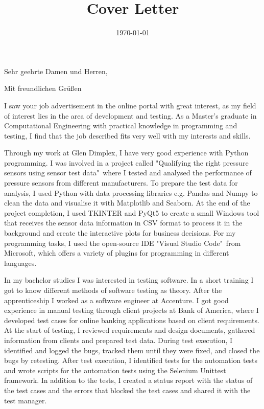 \documentclass[11.5pt,a4paper,sans]{moderncv}        %
\title{Cover Letter}                               %
\begin{document}
\subject{\small Bewerbung als Softwareingenieur Testautomatisierung}
\date{\small \today}

\opening{\vspace{-1mm} \small Sehr geehrte Damen und Herren,} %
\closing{\vspace{1mm} \small Mit freundlichen Grüßen \\ %
\vspace{-14mm}}
\makelettertitle
\vspace*{-8mm}
\justify
I saw your job advertisement in the online portal with great interest, as my field of interest lies in the area of development and testing. As a Master's graduate in Computational Engineering with practical knowledge in programming and testing, I find that the job described fits very well with my interests and skills.
        
Through my work at Glen Dimplex, I have very good experience with Python programming. I was involved in a project called "Qualifying the right pressure sensors using sensor test data"\, where I tested and analysed the performance of pressure sensors from different manufacturers. To prepare the test data for analysis, I used Python with data processing libraries e.g. Pandas and Numpy to clean the data and visualise it with Matplotlib and Seaborn. At the end of the project completion, I used TKINTER and PyQt5 to create a small Windows tool that receives the sensor data information in CSV format to process it in the background and create the interactive plots for business decisions. For my programming tasks, I used the open-source IDE "Visual Studio Code"\ from Microsoft, which offers a variety of plugins for programming in different languages. 

In my bachelor studies I was interested in testing software. In a short training I got to know different methods of software testing as theory. After the apprenticeship I worked as a software engineer at Accenture. I got good experience in manual testing through client projects at Bank of America, where I developed test cases for online banking applications based on client requirements. At the start of testing, I reviewed requirements and design documents, gathered information from clients and prepared test data. During test execution, I identified and logged the bugs, tracked them until they were fixed, and closed the bugs by retesting. After test execution, I identified tests for the automation tests and wrote scripts for the automation tests using the Selenium Unittest framework. In addition to the tests, I created a status report with the status of the test cases and the errors that blocked the test cases and shared it with the test manager.
\end{document}
